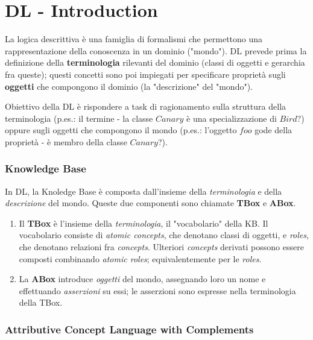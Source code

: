 \chapter{DL - Introduction}

La logica descrittiva è una famiglia di formalismi che permettono una rappresentazione della conoscenza in un dominio ("mondo"). DL prevede prima la definizione della \textbf{terminologia} rilevanti del dominio (classi di oggetti e gerarchia fra queste); questi concetti sono poi impiegati per specificare proprietà sugli \textbf{oggetti} che compongono il dominio (la "descrizione" del "mondo").

Obiettivo della DL è rispondere a task di ragionamento sulla struttura della terminologia (p.es.: il termine - la classe $Canary$ è una specializzazione di $Bird$?) oppure sugli oggetti che compongono il mondo (p.es.: l'oggetto $foo$ gode della proprietà - è membro della classe $Canary$?).

\subsection{Knowledge Base}

In DL, la Knoledge Base è composta dall'insieme della \textit{terminologia} e della \textit{descrizione} del mondo. Queste due componenti sono chiamate \textbf{TBox} e \textbf{ABox}.
\begin{enumerate}
\item Il \textbf{TBox} è l'insieme della \textit{terminologia}, il "vocabolario" della KB. Il vocabolario consiste di \textit{atomic concepts}, che denotano classi di oggetti, e \textit{roles}, che denotano relazioni fra \textit{concepts}. Ulteriori \textit{concepts} derivati possono essere composti combinando \textit{atomic roles}; equivalentemente per le \textit{roles}.
\item La \textbf{ABox} introduce \textit{oggetti} del mondo, assegnando loro un nome e effettuando \textit{asserzioni} su essi; le asserzioni sono espresse nella terminologia della TBox.
\end{enumerate}
\subsection{Attributive Concept Language with Complements}

